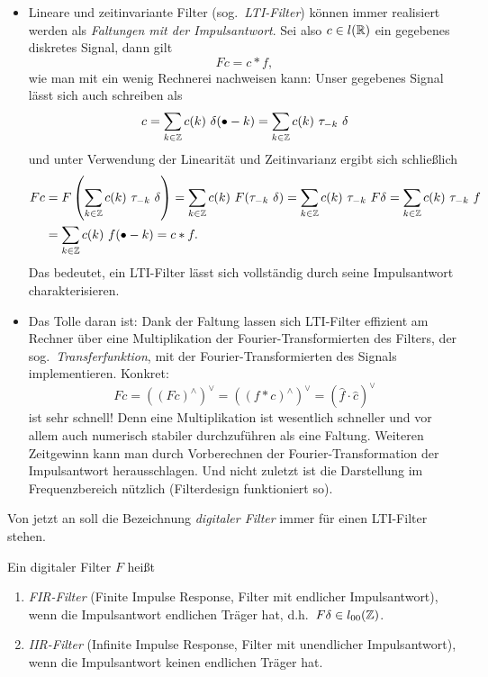 \begin{remark}\leavevmode
\begin{itemize}
\item Lineare und zeitinvariante Filter (sog.\ \emph{LTI-Filter}) können immer realisiert 
werden als \emph{Faltungen mit der Impulsantwort}. Sei also $ c \in l(\mathbb{R}) $ ein gegebenes diskretes 
Signal, dann gilt
\[
  Fc = c * f,
\]
wie man mit ein wenig Rechnerei nachweisen kann: Unser gegebenes Signal lässt sich auch schreiben
als
\[
  c = \sum_{k \in \Z} c(k) \ \delta(\bullet - k) = \sum_{k \in \Z} c(k) \ \tau_{-k} \ \delta
\]
und unter Verwendung der Linearität und Zeitinvarianz ergibt sich schließlich
\begin{align*}
   Fc
&= F \left( \sum_{k \in \mathbb{Z}} c(k) \ \tau_{-k} \ \delta \right) 
 = \sum_{k \in \mathbb{Z}} c(k) \ F(\tau_{-k} \ \delta)
 = \sum_{k \in \mathbb{Z}} c(k) \ \tau_{-k} \ F \delta
 = \sum_{k \in \mathbb{Z}} c(k) \ \tau_{-k} \ f \\
&= \sum_{k \in \mathbb{Z}} c(k) \ f(\bullet - k) = c * f.
\end{align*}
Das bedeutet, ein LTI-Filter lässt sich vollständig durch seine Impulsantwort charakterisieren.
\item Das Tolle daran ist: Dank der Faltung lassen sich LTI-Filter effizient am Rechner über eine 
Multiplikation der Fourier-Transformierten des Filters, der sog.\ \emph{Transferfunktion}, mit
der Fourier-Transformierten des Signals implementieren. Konkret:
\[
  Fc = \left( (Fc)^{\wedge} \right)^{\vee} = \left( (f * c)^{\wedge} \right)^{\vee}
     = \left( \widehat{f} \cdot \widehat{c} \right)^{\vee}
\]
ist sehr schnell! Denn eine Multiplikation ist wesentlich schneller und vor allem auch numerisch
stabiler durchzuführen als eine Faltung. Weiteren Zeitgewinn kann man durch Vorberechnen der
Fourier-Transformation der Impulsantwort herausschlagen. Und nicht zuletzt ist die Darstellung im
Frequenzbereich nützlich (Filterdesign funktioniert so).
\end{itemize}
\end{remark}

Von jetzt an soll die Bezeichnung \emph{digitaler Filter} immer für einen LTI-Filter stehen.

\begin{definition}
Ein digitaler Filter $ F $ heißt
\begin{enumerate}
\item \emph{FIR-Filter} (Finite Impulse Response, Filter mit endlicher Impulsantwort), wenn die
  Impulsantwort endlichen Träger hat, d.h.\ $ F\delta \in l_{00}(\mathbb{Z}) $.
\item \emph{IIR-Filter} (Infinite Impulse Response, Filter mit unendlicher Impulsantwort), wenn die
  Impulsantwort keinen endlichen Träger hat.
\end{enumerate}
\end{definition}

